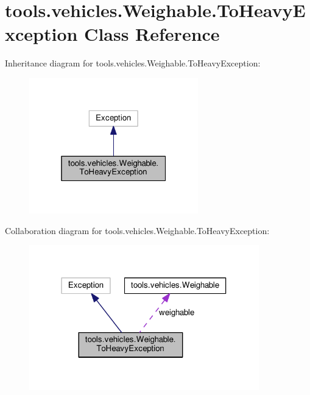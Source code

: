 \hypertarget{classtools_1_1vehicles_1_1_weighable_1_1_to_heavy_exception}{}\section{tools.\+vehicles.\+Weighable.\+To\+Heavy\+Exception Class Reference}
\label{classtools_1_1vehicles_1_1_weighable_1_1_to_heavy_exception}


Inheritance diagram for tools.\+vehicles.\+Weighable.\+To\+Heavy\+Exception\+:
\nopagebreak
\begin{figure}[H]
\begin{center}
\leavevmode
\includegraphics[width=208pt]{classtools_1_1vehicles_1_1_weighable_1_1_to_heavy_exception__inherit__graph}
\end{center}
\end{figure}


Collaboration diagram for tools.\+vehicles.\+Weighable.\+To\+Heavy\+Exception\+:
\nopagebreak
\begin{figure}[H]
\begin{center}
\leavevmode
\includegraphics[width=283pt]{classtools_1_1vehicles_1_1_weighable_1_1_to_heavy_exception__coll__graph}
\end{center}
\end{figure}
